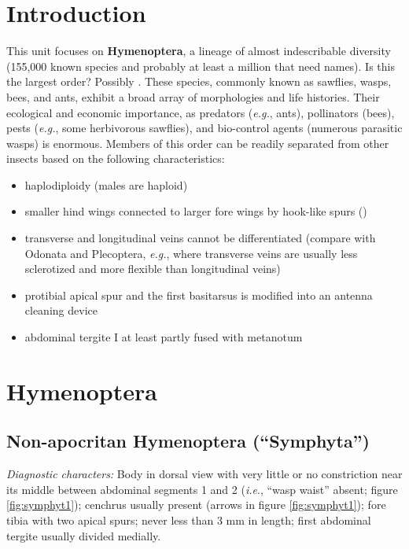 \section*{Introduction}
This unit focuses on \textbf{Hymenoptera}, a lineage of almost indescribable diversity (155,000 known species and probably at least a million that need names). Is this the largest order? Possibly \citep{forbes2018quantifying}. These species, commonly known as sawflies, wasps, bees, and ants, exhibit a broad array of morphologies and life histories. Their ecological and economic importance, as predators (\textit{e.g.}, ants), pollinators (bees), pests (\textit{e.g.}, some herbivorous sawflies), and bio-control agents (numerous parasitic wasps) is enormous. Members of this order can be readily separated from other insects based on the following characteristics:

\begin{itemize}
\item haplodiploidy (males are haploid)
\item smaller hind wings connected to larger fore wings by hook-like spurs ()
\item transverse and longitudinal veins cannot be differentiated (compare with Odonata and Plecoptera, \textit{e.g.}, where transverse veins are usually less sclerotized and more flexible than longitudinal veins)
\item protibial apical spur and the first basitarsus is modified into an antenna cleaning device
\item abdominal tergite I at least partly fused with metanotum
\end{itemize}

\section{Hymenoptera}
\subsection{Non-apocritan Hymenoptera (``Symphyta'')}
\noindent{}\textit{Diagnostic characters:} Body in dorsal view with very little or no constriction near its middle between abdominal segments 1 and 2 (\textit{i.e}., ``wasp waist'' absent; figure \ref{fig:symphyt1}); cenchrus usually present (arrows in figure \ref{fig:symphyt1}); fore tibia with two apical spurs; never less than 3 mm in length; first abdominal tergite usually divided medially.\vspace{3mm}

